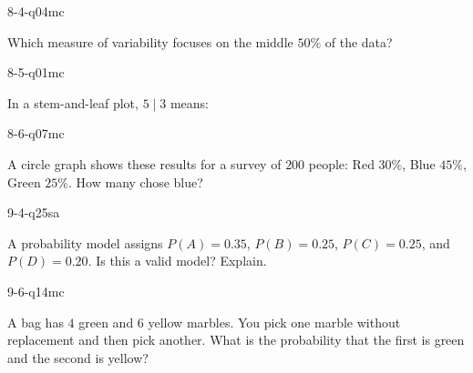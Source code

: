 \begin{practiceQuestion}{8-4-q04}{mc}
\begin{questionText}
Which measure of variability focuses on the middle $50\%$ of the data?
\end{questionText}
\end{practiceQuestion}

\begin{practiceQuestion}{8-5-q01}{mc}
\begin{questionText}
In a stem-and-leaf plot, $5 \mid 3$ means:
\end{questionText}
\end{practiceQuestion}

\begin{practiceQuestion}{8-6-q07}{mc}
\begin{questionText}
A circle graph shows these results for a survey of $200$ people: Red $30\%$, Blue $45\%$, Green $25\%$. How many chose blue?
\end{questionText}
\end{practiceQuestion}

\begin{practiceQuestion}{9-4-q25}{sa}
\begin{questionText}
A probability model assigns $P(A) = 0.35$, $P(B) = 0.25$, $P(C) = 0.25$, and $P(D) = 0.20$. Is this a valid model? Explain.
\end{questionText}
\end{practiceQuestion}

\begin{practiceQuestion}{9-6-q14}{mc}
\begin{questionText}
A bag has $4$ green and $6$ yellow marbles. You pick one marble without replacement and then pick another. What is the probability that the first is green and the second is yellow?
\end{questionText}
\end{practiceQuestion}

